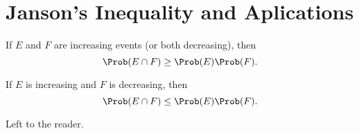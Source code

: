 \newpage
\section{Janson's Inequality and Aplications}

\begin{lem}\label{lem:harris-1960}
	If $E$ and $F$ are increasing events (or both decreasing), then \[
		\Prob(E \cap F) \ge \Prob(E)\Prob(F).
	\]

	If $E$ is increasing and $F$ is decreasing, then \[
		\Prob(E \cap F) \le \Prob(E)\Prob(F).
	\]
\end{lem}
\begin{dem}
	Left to the reader.
\end{dem}


